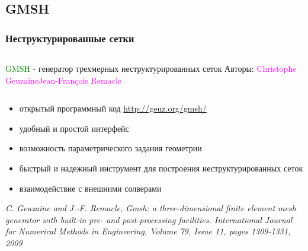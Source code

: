 \documentclass[ucs]{beamer}
\begin{document}
\subsection{GMSH}
\begin{frame}
	\frametitle{Неструктурированные сетки}
	\begin{columns}
		{\Large \textcolor{green}{GMSH} - генератор трехмерных неструктурированных сеток}
		\newline Авторы: \textcolor{magenta}{Christophe Geuzaine\newline Jean-François Remacle\newline}
	\end{columns}
	\begin{itemize}
	\item открытый программный код \url{http://geuz.org/gmsh/}
	\item удобный и простой интерфейс
	\item возможность параметрического задания геометрии
	\item быстрый и надежный инструмент для построения неструктурированных сеток
	\item взаимодействие с внешними солверами
	\end{itemize}
	\textit{C. Geuzaine and J.-F. Remacle, Gmsh: a three-dimensional finite element mesh generator with built-in pre- and post-processing facilities. International Journal for Numerical Methods in Engineering, Volume 79, Issue 11, pages 1309-1331, 2009}
\end{frame}
\end{document}
